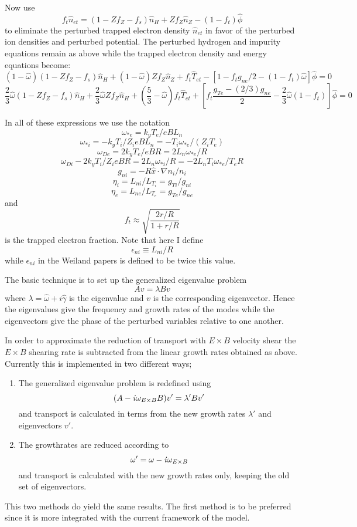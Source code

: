 Now use
\[ f_t \hat{n}_{et} = ( 1 - Z f_Z - f_s ) \hat{n}_H
   + Z f_Z \hat{n}_Z - ( 1 - f_t ) \hat{\phi} \]
to eliminate the perturbed trapped electron density $\hat{n}_{et}$
in favor of the perturbed ion densities and perturbed potential.
The perturbed hydrogen and impurity equations remain as above
while the trapped electron density and energy equations become:
\[ (1-\hat{\omega}) ( 1 - Z f_Z - f_s ) \hat{n}_H
 + (1-\hat{\omega}) Z f_Z \hat{n}_Z  + f_t \hat{T}_{et}
 - [ 1 - f_t g_{ne} / 2 - ( 1 - f_t ) \hat{\omega} ] \hat{\phi}
 = 0 \]
\[ \frac{2}{3} \hat{\omega} ( 1 - Z f_Z - f_s ) \hat{n}_H
 + \frac{2}{3} \hat{\omega} Z f_Z \hat{n}_H
 + \left( \frac{5}{3} - \hat{\omega} \right) f_t \hat{T}_{et}
 + \left[ f_t \frac{g_{Te} - (2/3) g_{ne}}{2}
   - \frac{2}{3} \hat{\omega} ( 1 - f_t ) \right] \hat{\phi}
 = 0  \]

In all of these expressions we use the notation
$$ \omega_{*e} = k_y T_e / e B L_n $$
$$ \omega_{*i} = - k_y T_i / Z_i e B L_n
    = - T_i \omega_{*e} / ( Z_i T_e ) $$
$$ \omega_{De} = 2 k_y T_e / e B R = 2 L_n \omega_{*e} / R $$
$$ \omega_{Di} - 2 k_y T_i / Z_i e B R = 2 L_n \omega_{*i} / R
   = - 2 L_n T_i \omega_{*e} / T_e R $$
$$ g_{ni} = - R \hat{x} \cdot \nabla n_i / n_i $$
$$ \eta_i = L_{ni} / L_{T_i} = g_{Ti} / g_{ni}  $$
$$ \eta_e = L_{ne} / L_{T_e} = g_{Te} / g_{ne} $$
and
$$ f_t \approx \sqrt{ \frac{ 2 r/R }{ 1 + r/R } } $$
is the trapped electron fraction.
Note that here I define 
\[ \epsilon_{ni} \equiv L_{ni} / R \]
while $ \epsilon_{ni} $ in the Weiland papers is defined to be
twice this value.

The basic technique is to set up the generalized eigenvalue problem
\[ A v = \lambda B v \]
where $ \lambda = \hat{\omega} + i \hat{\gamma} $ is the eigenvalue
and $ v $ is the corresponding eigenvector.
Hence the eigenvalues give the frequency and growth rates of the
modes while the eigenvectors give the phase of the perturbed
variables relative to one another.

In order to approximate the reduction of transport with $E\times B$ 
velocity shear the $E\times B $ shearing rate is subtracted from the 
linear growth rates obtained as above. Currently this is implemented in two different ways;
\begin{enumerate}
      \item The generalized eigenvalue problem is redefined using  
            \[ (A - {\it i} \omega_{E\times B} B) v' = {\lambda}' B v' \]
       and transport is calculated in terms from the new growth rates 
       ${\lambda}'$ and eigenvectors $v'$.

       \item The growthrates are reduced according to 
           \[ {\omega}' = \omega - {\it i} \omega_{E\times B} \]
       and transport is calculated with the new growth rates only,
       keeping the old set of eigenvectors.
\end{enumerate}
This two methods do yield the same results. The first method is to be preferred
since it is more integrated with the current framework of the model.

